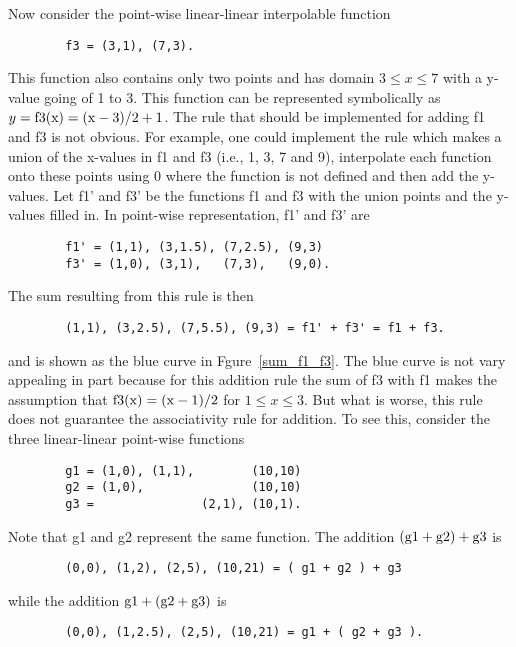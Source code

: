 \documentclass[11pt]{article}
\begin{document}
Now consider the point-wise linear-linear interpolable function
\begin{verbatim}
        f3 = (3,1), (7,3).
\end{verbatim}
This function also contains only two points and has domain $3 \le x \le 7$ with a y-value going of 1 to 3. This function
can be represented symbolically as $y = \rm{f3}(x) = ( x - 3 ) / 2 + 1$. The rule that should be implemented for 
adding f1 and f3 is not obvious. For example, one could implement the rule which makes a union of the x-values 
in f1 and f3 (i.e., 1, 3, 7 and 9),
interpolate each function onto these points using 0 where the function is not defined and then add the y-values.
Let f1' and f3' be the functions f1 and f3 with the union points and the y-values filled in. In
point-wise representation, f1' and f3' are
\begin{verbatim}
        f1' = (1,1), (3,1.5), (7,2.5), (9,3)
        f3' = (1,0), (3,1),   (7,3),   (9,0).
\end{verbatim}
The sum resulting from this rule is then
\begin{verbatim}
        (1,1), (3,2.5), (7,5.5), (9,3) = f1' + f3' = f1 + f3.
\end{verbatim}
and is shown as the blue curve in Fgure~\ref{sum_f1_f3}. The blue curve is not vary appealing in part because for this addition rule the
sum of f3 with f1 makes the assumption that $\rm{f3}(x) = ( x - 1 ) / 2$ for $1 \le x \le 3$.
But what is worse, this rule does not guarantee the associativity rule for addition. To see this, consider the three 
linear-linear point-wise functions
\begin{verbatim}
        g1 = (1,0), (1,1),        (10,10)
        g2 = (1,0),               (10,10)
        g3 =               (2,1), (10,1).
\end{verbatim}
Note that g1 and g2 represent the same function.
The addition $(\rm{g1} + \rm{g2}) + \rm{g3}$ is
\begin{verbatim}
        (0,0), (1,2), (2,5), (10,21) = ( g1 + g2 ) + g3
\end{verbatim}
while the addition $\rm{g1} + (\rm{g2} + \rm{g3})$ is
\begin{verbatim}
        (0,0), (1,2.5), (2,5), (10,21) = g1 + ( g2 + g3 ).
\end{verbatim}

\end{document}
